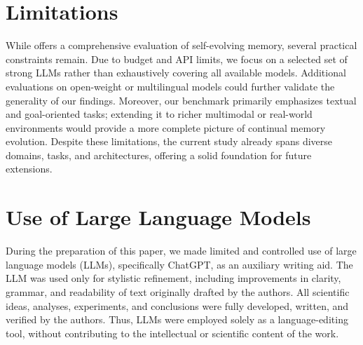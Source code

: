 \section{Limitations}
While \method offers a comprehensive evaluation of self-evolving memory, several practical constraints remain. 
Due to budget and API limits, we focus on a selected set of strong LLMs rather than exhaustively covering all available models. 
Additional evaluations on open-weight or multilingual models could further validate the generality of our findings. 
Moreover, our benchmark primarily emphasizes textual and goal-oriented tasks; extending it to richer multimodal or real-world environments would provide a more complete picture of continual memory evolution. 
Despite these limitations, the current study already spans diverse domains, tasks, and architectures, offering a solid foundation for future extensions.


\section{Use of Large Language Models}
During the preparation of this paper, we made limited and controlled use of large language models (LLMs), specifically ChatGPT, as an auxiliary writing aid. 
The LLM was used only for stylistic refinement, including improvements in clarity, grammar, and readability of text originally drafted by the authors. 
All scientific ideas, analyses, experiments, and conclusions were fully developed, written, and verified by the authors. 
Thus, LLMs were employed solely as a language-editing tool, without contributing to the intellectual or scientific content of the work.

